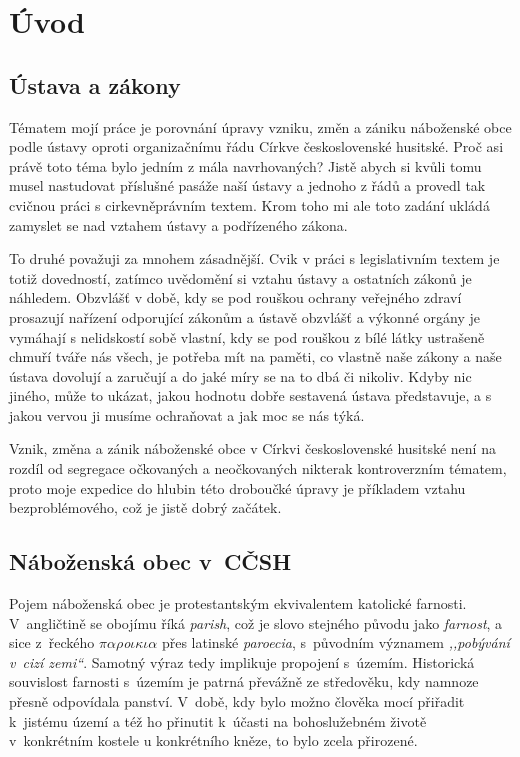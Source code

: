 \chapter{Úvod}
\label{kap:uvod}

\section{Ústava a zákony}

Tématem mojí práce je porovnání úpravy vzniku, změn a zániku náboženské obce
podle ústavy oproti organizačnímu řádu Církve československé husitské. Proč asi
právě toto téma bylo jedním z mála navrhovaných? Jistě abych si kvůli tomu musel
nastudovat příslušné pasáže naší ústavy a jednoho z řádů a provedl tak cvičnou
práci s cirkevněprávním textem. Krom toho mi ale toto zadání ukládá zamyslet se
nad vztahem ústavy a podřízeného zákona.

To druhé považuji za mnohem zásadnější. Cvik v práci s legislativním textem je
totiž dovedností, zatímco uvědomění si vztahu ústavy a ostatních zákonů je
náhledem. Obzvlášť v době, kdy se pod rouškou ochrany veřejného zdraví prosazují
nařízení odporující zákonům a ústavě obzvlášť a výkonné orgány je vymáhají s
nelidskostí sobě vlastní, kdy se pod rouškou z bílé látky ustrašeně chmuří tváře
nás všech, je potřeba mít na paměti, co vlastně naše zákony a naše ústava
dovolují a zaručují a do jaké míry se na to dbá či nikoliv. Kdyby nic jiného,
může to ukázat, jakou hodnotu dobře sestavená ústava představuje, a s jakou
vervou ji musíme ochraňovat a jak moc se nás týká.

Vznik, změna a zánik náboženské obce v Církvi československé husitské není na
rozdíl od segregace očkovaných a neočkovaných nikterak kontroverzním tématem,
proto moje expedice do hlubin této droboučké úpravy je příkladem vztahu
bezproblémového, což je jistě dobrý začátek.

\section{Náboženská obec v~CČSH}

Pojem náboženská obec je protestantským ekvivalentem katolické farnosti.
V~angličtině se obojímu říká \textit{parish}, což je slovo stejného původu jako
\textit{farnost}, a sice z~řeckého {$\pi\alpha\rho$\textit{o}$\iota\kappa\iota\alpha$} přes latinské
\textit{paroecia}, s~původním významem \textit{,,pobývání v~cizí zemi``}.
Samotný výraz tedy implikuje propojení s~územím.
Historická souvislost farnosti s~územím je patrná převážně ze středověku, kdy
namnoze přesně odpovídala panství.
V~době, kdy bylo možno
člověka mocí přiřadit k~jistému území a též ho přinutit k~účasti na
bohoslužebném životě v~konkrétním kostele u konkrétního kněze, to bylo zcela
přirozené.

